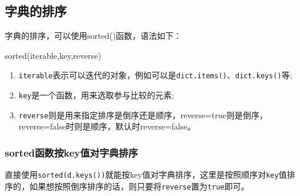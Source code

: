 \documentclass[]{ctexbook}
\newenvironment{Shaded}{\begin{snugshade}}{\end{snugshade}}
\newcommand{\BuiltInTok}[1]{#1}
\newcommand{\NormalTok}[1]{#1}
\providecommand{\tightlist}{%
  \setlength{\itemsep}{0pt}\setlength{\parskip}{0pt}}
\begin{document}
\hypertarget{ux5b57ux5178ux7684ux6392ux5e8f}{%
\subsection{字典的排序}\label{ux5b57ux5178ux7684ux6392ux5e8f}}

字典的排序，可以使用sorted()函数，语法如下：

\begin{Shaded}
\begin{Highlighting}[]
\BuiltInTok{sorted}\NormalTok{(iterable,key,reverse)}
\end{Highlighting}
\end{Shaded}

\begin{enumerate}
\def\labelenumi{\arabic{enumi}.}
\tightlist
\item
  \texttt{iterable}表示可以迭代的对象，例如可以是\texttt{dict.items()}、\texttt{dict.keys()}等;
\item
  \texttt{key}是一个函数，用来选取参与比较的元素;
\item
  \texttt{reverse}则是用来指定排序是倒序还是顺序，reverse=true则是倒序，reverse=false时则是顺序，默认时reverse=false。
\end{enumerate}

\hypertarget{sortedux51fdux6570ux6309keyux503cux5bf9ux5b57ux5178ux6392ux5e8f}{%
\subsubsection{sorted函数按key值对字典排序}\label{sortedux51fdux6570ux6309keyux503cux5bf9ux5b57ux5178ux6392ux5e8f}}

直接使用\texttt{sorted(d.keys())}就能按key值对字典排序，这里是按照顺序对\texttt{key}值排序的，如果想按照倒序排序的话，则只要将\texttt{reverse}置为\texttt{true}即可。
\end{document}
